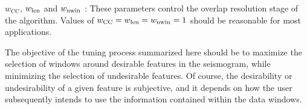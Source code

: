 $w_{\mathrm{CC}}$, $w_{\rm len}$ and $w_{\rm nwin}$ : These parameters control the overlap resolution stage of the algorithm.  Values of $w_{\mathrm{CC}}= w_{\rm len} = w_{\rm nwin} = 1$ should be reasonable for most applications.

The objective of the tuning process summarized here should be to maximize the selection of windows around desirable features in the seismogram, while minimizing the selection of undesirable features.
Of course, the desirability or undesirability of a given feature is subjective, and it depends on how the user subsequently intends to use the information contained within the data windows.

